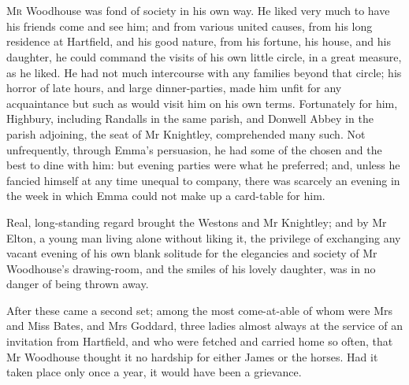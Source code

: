 \chapter[Chapter \thechapter]{}
\lettrine[lines=4,lraise=0.3]{M}{r} Woodhouse was fond of society in his own way. He liked very much to have his friends come and see him; and from various united causes, from his long residence at Hartfield, and his good nature, from his fortune, his house, and his daughter, he could command the visits of his own little circle, in a great measure, as he liked. He had not much intercourse with any families beyond that circle; his horror of late hours, and large dinner-parties, made him unfit for any acquaintance but such as would visit him on his own terms. Fortunately for him, Highbury, including Randalls in the same parish, and Donwell Abbey in the parish adjoining, the seat of Mr Knightley, comprehended many such. Not unfrequently, through Emma's persuasion, he had some of the chosen and the best to dine with him: but evening parties were what he preferred; and, unless he fancied himself at any time unequal to company, there was scarcely an evening in the week in which Emma could not make up a card-table for him.

Real, long-standing regard brought the Westons and Mr Knightley; and by Mr Elton, a young man living alone without liking it, the privilege of exchanging any vacant evening of his own blank solitude for the elegancies and society of Mr Woodhouse's drawing-room, and the smiles of his lovely daughter, was in no danger of being thrown away.

After these came a second set; among the most come-at-able of whom were Mrs and Miss Bates, and Mrs Goddard, three ladies almost always at the service of an invitation from Hartfield, and who were fetched and carried home so often, that Mr Woodhouse thought it no hardship for either James or the horses. Had it taken place only once a year, it would have been a grievance.

